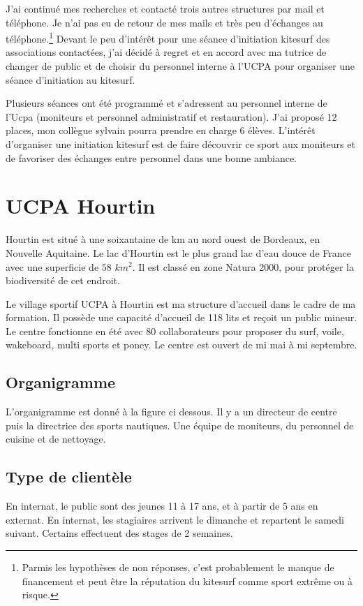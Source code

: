 \documentclass[11pt,a4paper]{report}
\begin{document}
J'ai continué mes recherches et contacté trois autres structures par mail et
téléphone. Je n'ai pas eu de retour de mes mails et très peu d'échanges 
au téléphone.\footnote{Parmis les hypothèses de non réponses, c'est probablement 
le manque de financement et peut \^etre la réputation du kitesurf comme sport extr\^eme 
ou à risque.}
Devant le peu d’intérêt pour une séance d'initiation kitesurf
des associations contactées, j'ai décidé à regret et en accord avec ma tutrice
de changer de public et de choisir du personnel interne à l'UCPA pour organiser
une séance d'initiation au kitesurf. 

Plusieurs séances ont été programmé et s'adressent au personnel 
interne de l'Ucpa (moniteurs et personnel administratif et restauration).
J'ai  proposé 12 places, mon collègue sylvain pourra prendre en charge 6 élèves.
L'intér\^et d'organiser une initiation kitesurf est de faire découvrir ce
sport aux moniteurs et de favoriser des échanges entre personnel dans 
une bonne ambiance.

\section{UCPA Hourtin}

Hourtin est situé à une soixantaine de km au nord ouest de Bordeaux,
en Nouvelle Aquitaine. Le lac d'Hourtin est le plus grand lac d'eau
douce de France avec une superficie de $58 \,\,km^2$.
Il est classé en zone Natura 2000\cite{natura2000}, 
pour protéger la biodiversité de cet endroit.

Le village sportif UCPA à Hourtin est ma structure d'accueil dans le cadre de
ma formation. Il possède une capacité d'accueil de 118 lits et reçoit un 
public mineur. Le centre fonctionne en été avec 80 collaborateurs pour
proposer du surf, voile, wakeboard, multi sports et poney.
Le centre est ouvert de mi mai à mi septembre.
 
\subsection{Organigramme}
L'organigramme est donné à la figure ci dessous. Il y a un directeur de centre
puis la directrice des sports nautiques. Une équipe de moniteurs, du
personnel de cuisine et de nettoyage.
\subsection{Type de clientèle}
En internat, le public sont des jeunes 11 à 17 ans, et  à partir de 5 ans  en externat.
En internat, les stagiaires arrivent le dimanche et repartent le samedi suivant.
Certains effectuent des stages de 2 semaines.
\end{document}
